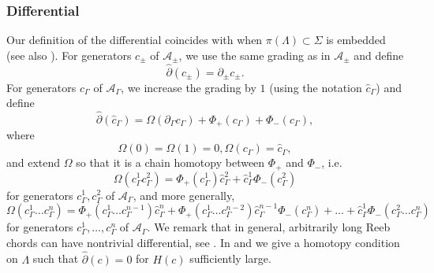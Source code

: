 \documentclass[11pt]{amsart}
\theoremstyle{mystyle}
\newcommand{\<}{\langle}
\renewcommand{\>}{\rangle}
\begin{document}
\subsubsection{Differential}

Our definition of the differential coincides with \cite[Lem. 2.3]{ekholm2016nonloose} when $\pi(\Lambda) \subset \Sigma$ is embedded (see also \cite[Sec. 3.4, 3.5]{ekholm2016cobordisms}). For generators $c_\pm$ of $\mathcal{A}_\pm$, we use the same grading as in $\mathcal{A}_\pm$ and define \[\widehat{\partial}(c_\pm) = \partial_\pm c_\pm.\] For generators $c_\Gamma$ of $\mathcal{A}_\Gamma$, we increase the grading by $1$ (using the notation $\widehat{c}_\Gamma$) and define \[\widehat{\partial}(\widehat{c}_\Gamma) = \Omega(\partial_\Gamma c_\Gamma) + \Phi_+(c_\Gamma) + \Phi_-(c_\Gamma),\] where \[\Omega(0) = \Omega(1) = 0, \Omega(c_\Gamma) = \widehat{c}_\Gamma,\] and extend $\Omega$ so that it is a chain homotopy between $\Phi_+$ and $\Phi_-$, i.e. \[\Omega(c_\Gamma^1c_\Gamma^2) = \Phi_+(c_\Gamma^1)\widehat{c}_\Gamma^2 + \widehat{c}_\Gamma^1\Phi_-(c_\Gamma^2)\] for generators $c_\Gamma^1, c_\Gamma^2$ of $\mathcal{A}_\Gamma$, and more generally, \[\Omega(c^1_\Gamma \dots c^n_\Gamma) = \Phi_+(c^1_\Gamma \dots c^{n-1}_\Gamma)\widehat{c}^n_\Gamma + \Phi_+(c^1_\Gamma \dots c^{n-2}_\Gamma)\widehat{c}^{n-1}_\Gamma\Phi_-(c^n_\Gamma) + \dots + \widehat{c}^1_\Gamma \Phi_-(c^2_\Gamma \dots c^n_\Gamma)\] for generators $c_\Gamma^1, \dots, c_\Gamma^n$ of $\mathcal{A}_\Gamma$. We remark that in general, arbitrarily long Reeb chords can have nontrivial differential, see . In  and  we give a homotopy condition on $\Lambda$ such that $\widehat{\partial}(c)=0$ for $H(c)$ sufficiently large.
\end{document}
